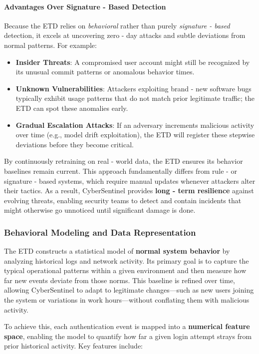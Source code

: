 \documentclass{article}
\begin{document}
\paragraph{Advantages Over Signature - Based Detection}
Because the ETD relies on \emph{behavioral} rather than purely \emph{signature - based} detection, it excels at uncovering zero - day attacks and subtle deviations from normal patterns. For example:
\begin{itemize}
    \item \textbf{Insider Threats}: A compromised user account might still be recognized by its unusual commit patterns or anomalous behavior times.
    \item \textbf{Unknown Vulnerabilities}: Attackers exploiting brand - new software bugs typically exhibit usage patterns that do not match prior legitimate traffic; the ETD can spot these anomalies early.
    \item \textbf{Gradual Escalation Attacks}: If an adversary increments malicious activity over time (e.g., model drift exploitation), the ETD will register these stepwise deviations before they become critical.
\end{itemize}

By continuously retraining on real - world data, the ETD ensures its behavior baselines remain current. This approach fundamentally differs from rule -  or signature - based systems, which require manual updates whenever attackers alter their tactics. As a result, CyberSentinel provides \textbf{long - term resilience} against evolving threats, enabling security teams to detect and contain incidents that might otherwise go unnoticed until significant damage is done.

\subsubsection{Behavioral Modeling and Data Representation}
The ETD constructs a statistical model of \textbf{normal system behavior} by analyzing historical logs and network activity. Its primary goal is to capture the typical operational patterns within a given environment and then measure how far new events deviate from those norms. This baseline is refined over time, allowing CyberSentinel to adapt to legitimate changes—such as new users joining the system or variations in work hours—without conflating them with malicious activity.

To achieve this, each authentication event is mapped into a \textbf{numerical feature space}, enabling the model to quantify how far a given login attempt strays from prior historical activity. Key features include:
\end{document}
